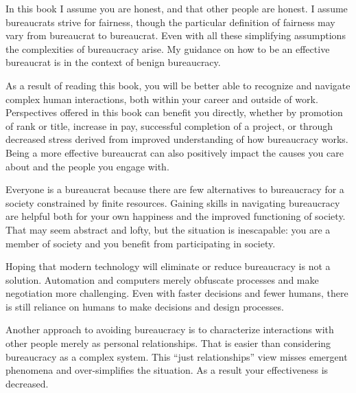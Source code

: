 In this book I assume you are honest, and that other people are honest.  
I assume bureaucrats strive for fairness, though the particular definition of fairness may vary from bureaucrat to bureaucrat. 
Even with all these simplifying assumptions the complexities of bureaucracy arise. My guidance on how to be an effective bureaucrat is in the context of benign bureaucracy.


As a result of reading this book, you will be better able to recognize and navigate complex human interactions, both within your career and outside of work. Perspectives offered in this book can benefit you directly, whether by promotion of rank or title, increase in pay, successful completion of a project, or through decreased stress derived from improved understanding of how bureaucracy works. Being a more effective bureaucrat can also positively impact the causes you care about and the people you engage with.





Everyone is a bureaucrat because there are few alternatives to bureaucracy for a society constrained by finite resources. Gaining skills in navigating bureaucracy are helpful both for your own happiness and the improved functioning of society. That may seem abstract and lofty, but the situation is inescapable: you are a member of society and you benefit from participating in society. 

Hoping that modern technology will eliminate or reduce bureaucracy is not a solution. Automation and computers merely obfuscate processes and make negotiation more challenging. Even with faster decisions and fewer humans, there is still reliance on humans to make decisions and design processes.

Another approach to avoiding bureaucracy is to characterize interactions with other people merely as personal relationships. That is easier than considering bureaucracy as a complex system.
This ``just relationships'' view misses emergent phenomena and over-simplifies the situation. As a result your effectiveness is decreased.




